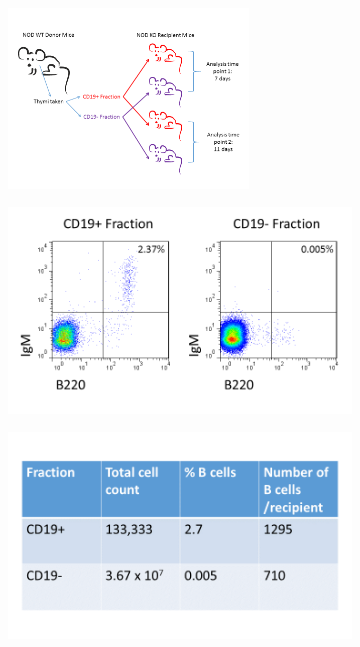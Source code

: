 \begin{figure}
	\begin{subfigure}{\textwidth}
	\centering
	\caption{}
	\includegraphics[width=0.7\textwidth]{Figures/KOTransferexptsetup.png}
	\label{fig:KOtransfersetup}
	\end{subfigure}
	\begin{subfigure}{0.5\textwidth}
	\caption{}
	\includegraphics[width=\textwidth]{Figures/NODdonor.png}
	\label{subfig:NODdonorseparation}
	\end{subfigure}
	\begin{subfigure}{0.5\textwidth}
	\centering
	\caption{}
	\includegraphics[width=\textwidth]{Figures/WTdonortable2.png}
	\label{subfig:WTdonortable}
	\end{subfigure}
\caption[Experimental setup and donor cell populations for transfer experiments]{}
\label{fig:Transfersetup}
\end{figure}
	
